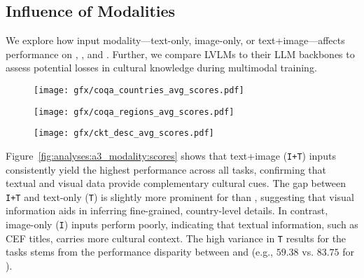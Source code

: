 \subsection{Influence of Modalities}
\label{sec:analyses:a3_modality}
%
We explore how input modality---text-only, image-only, or text+image---affects performance on \coqac, \coqar, and \ckqad.
%
Further, we compare LVLMs to their LLM backbones to assess potential losses in cultural knowledge during multimodal training.
%

\begin{figure*}[t]
    \centering
     \begin{subfigure}{1.\linewidth}
        \centering
        \texttt{[image: gfx/coqa\_countries\_avg\_scores.pdf]}
        \caption{\coqac}
        \label{fig:analyses:a3_modality:coqa-countries}
    \end{subfigure}
    
     \begin{subfigure}{1.\linewidth}
        \centering
        \texttt{[image: gfx/coqa\_regions\_avg\_scores.pdf]}
        \caption{\coqar}
        \label{fig:analyses:a3_modality:coqa-regions}
    \end{subfigure}

    \begin{subfigure}{1.\linewidth}
        \centering
        \texttt{[image: gfx/ckt\_desc\_avg\_scores.pdf]}
        \caption{\ckqad}
        \label{fig:analyses:a3_modality:ckqa-desc}
    \end{subfigure}
    \caption{Aggregated results including multimodal input variations: \textbf{T}ext-only, \textbf{I}mage-only, \textbf{T}ext+\textbf{I}mage.}
    \label{fig:analyses:a3_modality:scores}
\end{figure*}
%
%
Figure~\ref{fig:analyses:a3_modality:scores} shows that text+image (\texttt{I+T}) inputs consistently yield the highest performance across all tasks, confirming that textual and visual data provide complementary cultural cues.
%
The gap between \texttt{I+T} and text-only (\texttt{T}) is slightly more prominent for \coqac than \coqar, suggesting that visual information aids in inferring fine-grained, country-level details.
%
In contrast, image-only (\texttt{I}) inputs perform poorly, indicating that textual information, such as CEF titles, carries more cultural context.
%
The high variance in \texttt{T} results for the \coqa tasks stems from the performance disparity between  and  (e.g., $59.38$ vs. $83.75$ for \RegW).
%

